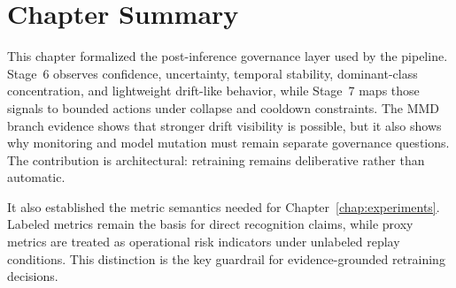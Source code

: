 \section{Chapter Summary}

This chapter formalized the post-inference governance layer used by the pipeline. Stage~6 observes confidence, uncertainty, temporal stability, dominant-class concentration, and lightweight drift-like behavior, while Stage~7 maps those signals to bounded actions under collapse and cooldown constraints. The MMD branch evidence shows that stronger drift visibility is possible, but it also shows why monitoring and model mutation must remain separate governance questions. The contribution is architectural: retraining remains deliberative rather than automatic.

It also established the metric semantics needed for Chapter~\ref{chap:experiments}. Labeled metrics remain the basis for direct recognition claims, while proxy metrics are treated as operational risk indicators under unlabeled replay conditions. This distinction is the key guardrail for evidence-grounded retraining decisions.
